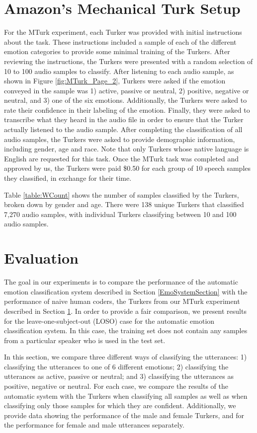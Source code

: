 \documentclass{article}
\begin{document}
\section{Amazon's Mechanical Turk Setup} \label{AMTSection}
For the MTurk experiment, each Turker was provided with initial instructions about the task. These instructions included a sample of each of the different emotion categories to provide some minimal training of the Turkers. After reviewing the instructions, the Turkers were presented with a random selection of 10 to 100 audio samples to classify. After listening to each audio sample, as shown in Figure \ref{fig:MTurk_Page_2}, Turkers were asked if the emotion conveyed in the sample was 1) active, passive or neutral, 2) positive, negative or neutral, and 3) one of the six emotions.  Additionally, the Turkers were asked to rate their confidence in their labeling of the emotion.  Finally, they were asked to transcribe what they heard in the audio file in order to ensure that the Turker actually listened to the audio sample. After completing the classification of all audio samples, the Turkers were asked to provide demographic information, including gender, age and race. Note that only Turkers whose native language is English are requested for this  task. Once the MTurk task was completed and approved by us, the Turkers were paid \$0.50 for each group of 10 speech samples they classified, in exchange for their time. \par
Table \ref{table:WCount} shows the number of samples classified by the Turkers, broken down by gender and age. There were 138 unique Turkers that classified 7,270 audio samples, with individual Turkers classifying between 10 and 100 audio samples.

\section{Evaluation} \label{Evaluation}
The goal in our experiments is to compare the performance of the automatic emotion classification system described in Section \ref{EmoSystemSection} with the performance of naive human coders, the Turkers from our MTurk experiment described in Section \ref{AMTSection}.  In order to provide a fair comparison, we present results for the leave-one-subject-out (LOSO) case for the automatic emotion classification system.  In this case, the training set does not contain any samples from a particular speaker who is used in the test set. \par 
In this section, we compare three different ways of classifying the utterances: 1) classifying the utterances to one of 6 different emotions; 2) classifying the utterances as active, passive or neutral; and 3) classifying the  utterances as positive, negative or neutral.  For each case, we compare the results of the automatic system with the Turkers when classifying all samples as well as when classifying only those samples for which they are confident.  Additionally, we provide data showing the performance of the male and female Turkers, and for the performance for female and male utterances separately.
\end{document}
